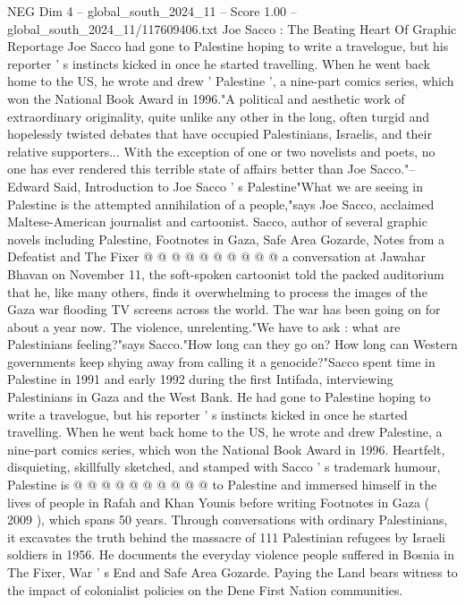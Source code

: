 \begin{textsample}{NEG Dim 4 – global\_south\_2024\_11 – Score 1.00 – global\_south\_2024\_11/117609406.txt}  \label{ex:f4_neg_175}
Joe Sacco : The Beating Heart Of Graphic Reportage Joe Sacco had gone to Palestine hoping to write a travelogue, but his reporter ' s instincts kicked in once he started travelling.
When he went back home to the US, he wrote and drew ' Palestine ', a nine-part comics series, which won the National Book Award in 1996."A political and aesthetic work of extraordinary originality, quite unlike any other in the long, often turgid and hopelessly twisted debates that have occupied Palestinians, Israelis, and their relative supporters...
With the exception of one or two novelists and poets, no one has ever rendered this terrible state of affairs better than Joe Sacco."-- Edward Said, Introduction to Joe Sacco ' s Palestine"What we are seeing in Palestine is the attempted annihilation of a people,"says Joe Sacco, acclaimed Maltese-American journalist and cartoonist.
Sacco, author of several graphic novels including Palestine, Footnotes in Gaza, Safe Area Gozarde, Notes from a Defeatist and The Fixer @ @ @ @ @ @ @ @ @ @ a conversation at Jawahar Bhavan on November 11, the soft-spoken cartoonist told the packed auditorium that he, like many others, finds it overwhelming to process the images of the Gaza war flooding TV screens across the world.
The war has been going on for about a year now.
The violence, unrelenting."We have to ask : what are Palestinians feeling?"says Sacco."How long can they go on?
How long can Western governments keep shying away from calling it a genocide?"Sacco spent time in Palestine in 1991 and early 1992 during the first Intifada, interviewing Palestinians in Gaza and the West Bank.
He had gone to Palestine hoping to write a travelogue, but his reporter ' s instincts kicked in once he started travelling.
When he went back home to the US, he wrote and drew Palestine, a nine-part comics series, which won the National Book Award in 1996.
Heartfelt, disquieting, skillfully sketched, and stamped with Sacco ' s trademark humour, Palestine is @ @ @ @ @ @ @ @ @ @ to Palestine and immersed himself in the lives of people in Rafah and Khan Younis before writing Footnotes in Gaza ( 2009 ), which spans 50 years.
Through conversations with ordinary Palestinians, it excavates the truth behind the massacre of 111 Palestinian refugees by Israeli soldiers in 1956.
He documents the everyday violence people suffered in Bosnia in The Fixer, War ' s End and Safe Area Gozarde.
Paying the Land bears witness to the impact of colonialist policies on the Dene First Nation communities.

\end{textsample}
